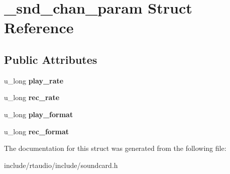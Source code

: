 \hypertarget{struct__snd__chan__param}{}\section{\+\_\+snd\+\_\+chan\+\_\+param Struct Reference}
\label{struct__snd__chan__param}
\subsection*{Public Attributes}
\begin{DoxyCompactItemize}
\item 
u\+\_\+long {\bfseries play\+\_\+rate}\hypertarget{struct__snd__chan__param_ac8f91aa3debc2d41f81252a93e470659}{}\label{struct__snd__chan__param_ac8f91aa3debc2d41f81252a93e470659}

\item 
u\+\_\+long {\bfseries rec\+\_\+rate}\hypertarget{struct__snd__chan__param_a89f38e05357c33d618ed23e141c6f4b2}{}\label{struct__snd__chan__param_a89f38e05357c33d618ed23e141c6f4b2}

\item 
u\+\_\+long {\bfseries play\+\_\+format}\hypertarget{struct__snd__chan__param_a29cef6aee29912a1c5b34c20ef964bc3}{}\label{struct__snd__chan__param_a29cef6aee29912a1c5b34c20ef964bc3}

\item 
u\+\_\+long {\bfseries rec\+\_\+format}\hypertarget{struct__snd__chan__param_a7af2eca26b7a3095732c33369fe9917d}{}\label{struct__snd__chan__param_a7af2eca26b7a3095732c33369fe9917d}

\end{DoxyCompactItemize}


The documentation for this struct was generated from the following file\+:\begin{DoxyCompactItemize}
\item 
include/rtaudio/include/soundcard.\+h\end{DoxyCompactItemize}

